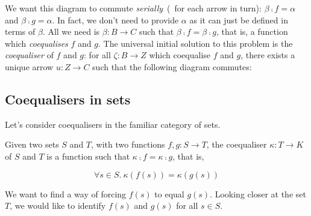 We want this diagram to commute \emph{serially}~(\ie~for each arrow in turn):
$\beta \comp f = \alpha$ and $\beta \comp g = \alpha$. In fact, we don't need
to provide $\alpha$ as it can just be defined in terms of $\beta$. All we need
is $\beta : B \to C$ such that $\beta \comp f = \beta \comp g$, that is, a
function which \emph{coequalises} $f$ and $g$.  The universal initial solution
to this problem is the \emph{coequaliser} of $f$ and $g$: for all 
$\zeta : B \to Z$ which coequalise $f$ and $g$, there exists a unique arrow 
$u : Z \to C$ such that the following diagram commutes:
\begin{center}
\end{center}

\subsection{Coequalisers in sets}
Let's consider coequalisers in the familiar category of sets.

\begin{center}
\end{center}

Given two sets $S$ and $T$, with two functions $f, g : S \to T$, the
coequaliser $\kappa : T \to K$ of $S$ and $T$ is a function such that 
$\kappa \comp f = \kappa \comp g$, that is,

\begin{equation*}
    \forall s \in S.\ \kappa (f(s)) = \kappa (g(s))
\end{equation*}

We want to find a way of forcing $f(s)$ to equal $g(s)$. Looking closer at the
set $T$, we would like to identify $f(s)$ and $g(s)$ for all $s \in S$.

\begin{center}
\end{center}

